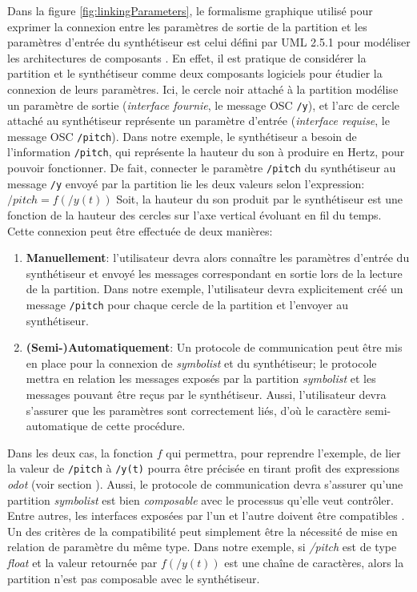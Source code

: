 Dans la figure \ref{fig:linkingParameters}, le formalisme graphique utilisé pour exprimer la connexion entre les paramètres de sortie de la partition et les paramètres d'entrée du synthétiseur est celui défini par UML 2.5.1 pour modéliser les architectures de composants \cite{omg2017}. En effet, il est pratique de considérer la partition et le synthétiseur comme deux composants logiciels pour étudier la connexion de leurs paramètres. Ici, le cercle noir attaché à la partition modélise un paramètre de sortie (\textit{interface fournie}, le message OSC \texttt{/y}), et l'arc de cercle attaché au synthétiseur représente un paramètre d'entrée (\textit{interface requise}, le message OSC \texttt{/pitch}).
Dans notre exemple, le synthétiseur a besoin de l'information \texttt{/pitch}, qui représente la hauteur du son à produire en Hertz, pour pouvoir fonctionner.
De fait, connecter le paramètre \texttt{/pitch} du synthétiseur au message \texttt{/y} envoyé par la partition lie les deux valeurs selon l'expression: $/pitch = f(/y(t))$
Soit, la hauteur du son produit par le synthétiseur est une fonction de la hauteur des cercles sur l'axe vertical évoluant en fil du temps. Cette connexion peut être effectuée de deux manières: 
\begin{enumerate}[label={(\arabic*)}]
	\item \textbf{Manuellement}: l'utilisateur devra alors connaître les paramètres d'entrée du synthétiseur et envoyé les messages correspondant en sortie lors de la lecture de la partition. Dans notre exemple, l'utilisateur devra explicitement créé un message \texttt{/pitch} pour chaque cercle de la partition et l'envoyer au synthétiseur.
	\item \textbf{(Semi-)Automatiquement}: Un protocole de communication peut être mis en place pour la connexion de \textit{symbolist} et du synthétiseur; le protocole mettra en relation les messages exposés par la partition \textit{symbolist} et les messages pouvant être reçus par le synthétiseur. Aussi, l'utilisateur devra s'assurer que les paramètres sont correctement liés, d'où le caractère semi-automatique de cette procédure. 
\end{enumerate}
%
Dans les deux cas, la fonction $f$ qui permettra, pour reprendre l'exemple, de lier la valeur de \texttt{/pitch} à \texttt{/y(t)} pourra être précisée en tirant profit des expressions \textit{odot} (voir section ).
Aussi, le protocole de communication devra s'assurer qu'une partition \textit{symbolist} est bien \textit{composable} avec le processus qu'elle veut contrôler. Entre autres, les interfaces exposées par l'un et l'autre doivent être compatibles \cite{chen2007}. Un des critères de la compatibilité peut simplement être la nécessité de mise en relation de paramètre du même type. Dans notre exemple, si \textit{/pitch} est de type \textit{float} et la valeur retournée par $f(/y(t))$ est une chaîne de caractères, alors la partition n'est pas composable avec le synthétiseur.

